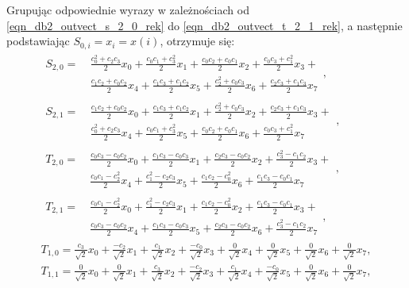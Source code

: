 Grupując odpowiednie wyrazy w zależnościach od \eqref{eqn_db2_outvect_s_2_0_rek} do \eqref{eqn_db2_outvect_t_2_1_rek}, a następnie podstawiając $S_{0,i} = x_{i} = x(i)$, otrzymuje się:
\begin{gather}
\begin{split}
S_{2,0} = ~
	& \frac{c_0^2 + c_2 c_3}{2} x_0 + \frac{c_0 c_1 + c_3^2}{2} x_1 + \frac{c_0 c_2 + c_0 c_1}{2} x_2 + \frac{c_0 c_3 + c_1^2}{2} x_3 + \\
	& \frac{c_1 c_2 + c_0 c_2}{2} x_4 + \frac{c_1 c_3 + c_1 c_2}{2} x_5 + \frac{c_2^2 + c_0 c_3}{2} x_6 + \frac{c_2 c_3 + c_1 c_3}{2} x_7
\end{split}
\label{eqn_db2_outvect_s_2_0_full}, \\
\begin{split}
S_{2,1} = ~
	& \frac{c_1 c_2 + c_0 c_2}{2} x_0 + \frac{c_1 c_3 + c_1 c_2}{2} x_1 + \frac{c_2^2 + c_0 c_3}{2} x_2 + \frac{c_2 c_3 + c_1 c_3}{2} x_3 + \\
	& \frac{c_0^2 + c_2 c_3}{2} x_4 + \frac{c_0 c_1 + c_3^2}{2} x_5 + \frac{c_0 c_2 + c_0 c_1}{2} x_6 + \frac{c_0 c_3 + c_1^2}{2} x_7
\end{split}
\label{eqn_db2_outvect_s_2_1_full}, \\
\begin{split}
T_{2,0} = ~
	& \frac{c_0 c_3 - c_0 c_2}{2} x_0 + \frac{c_1 c_3 - c_0 c_3}{2} x_1 + \frac{c_2 c_3 - c_0 c_2}{2} x_2 + \frac{c_3^2 - c_1 c_2}{2} x_3 + \\
	& \frac{c_0 c_1 - c_2^2}{2} x_4 + \frac{c_1^2 - c_2 c_3}{2} x_5 + \frac{c_1 c_2 - c_0^2}{2} x_6 + \frac{c_1 c_3 - c_0 c_1}{2} x_7
\end{split}
\label{eqn_db2_outvect_t_2_0_full}, \\
\begin{split}
T_{2,1} = ~
	& \frac{c_0 c_1 - c_2^2}{2} x_0 + \frac{c_1^2 - c_2 c_3}{2} x_1 + \frac{c_1 c_2 - c_0^2}{2} x_2 + \frac{c_1 c_3 - c_0 c_1}{2} x_3 + \\
	& \frac{c_0 c_3 - c_0 c_2}{2} x_4 + \frac{c_1 c_3 - c_0 c_3}{2} x_5 + \frac{c_2 c_3 - c_0 c_2}{2} x_6 + \frac{c_3^2 - c_1 c_2}{2} x_7
\end{split}
\label{eqn_db2_outvect_t_2_1_full}, \\
T_{1,0} = \frac{c_3}{\sqrt{2}} x_0 + \frac{- c_2}{\sqrt{2}} x_1 + \frac{c_1}{\sqrt{2}} x_2 + \frac{- c_0}{\sqrt{2}} x_3 + \frac{0}{\sqrt{2}} x_4 + \frac{0}{\sqrt{2}} x_5 + \frac{0}{\sqrt{2}} x_6 + \frac{0}{\sqrt{2}} x_7 \label{eqn_db2_outvect_t_1_0_full}, \\
T_{1,1} = \frac{0}{\sqrt{2}} x_0 + \frac{0}{\sqrt{2}} x_1 + \frac{c_3}{\sqrt{2}} x_2 + \frac{- c_2}{\sqrt{2}} x_3 + \frac{c_1}{\sqrt{2}} x_4 + \frac{- c_0}{\sqrt{2}} x_5 + \frac{0}{\sqrt{2}} x_6 + \frac{0}{\sqrt{2}} x_7 \label{eqn_db2_outvect_t_1_1_full}, \\

\end{gather}

